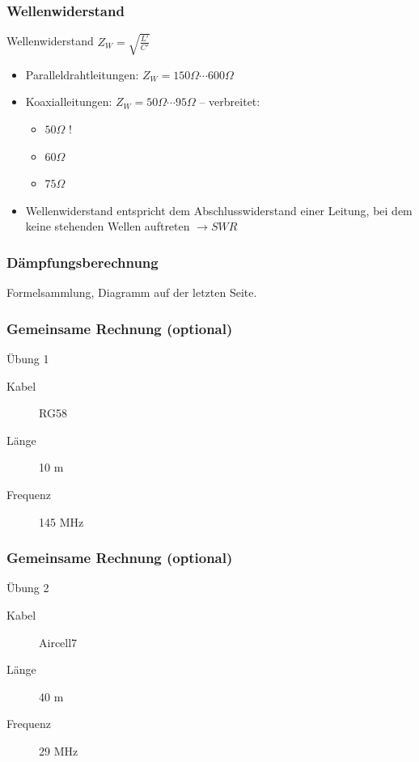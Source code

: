 \begin{frame}
  \frametitle{Wellenwiderstand}
  \begin{block}{Wellenwiderstand}
    \Huge{$Z_W = \sqrt{\frac{L'}{C'}}$}
  \end{block}
  \begin{itemize}
    \normalsize \item Paralleldrahtleitungen: $Z_W = 150 \Omega \cdots 600 \Omega$
    \item Koaxialleitungen: $Z_W =  50 \Omega \cdots 95 \Omega$ -- verbreitet:
      \begin{itemize}
        \item $50 \Omega$ !
        \item $60 \Omega$
        \item $75 \Omega$
      \end{itemize}
    \item Wellenwiderstand entspricht dem Abschlusswiderstand einer Leitung, bei
      dem keine stehenden Wellen auftreten $\rightarrow SWR$
  \end{itemize}
\end{frame}

\begin{frame}
  \frametitle{Dämpfungsberechnung}
  \begin{Large}
    Formelsammlung, Diagramm auf der letzten Seite.
  \end{Large}
\end{frame}

\begin{frame}
  \frametitle{Gemeinsame Rechnung (optional)}
  \begin{exampleblock}{Übung 1}
    \begin{description}
      \item[Kabel] RG58
      \item[Länge] 10 m
      \item[Frequenz] 145 MHz
    \end{description}
  \end{exampleblock}
\end{frame}

\begin{frame}
  \frametitle{Gemeinsame Rechnung (optional)}
  \begin{exampleblock}{Übung 2}
    \begin{description}
      \item[Kabel] Aircell7
      \item[Länge] 40 m
      \item[Frequenz] 29 MHz
    \end{description}
  \end{exampleblock}
\end{frame}

